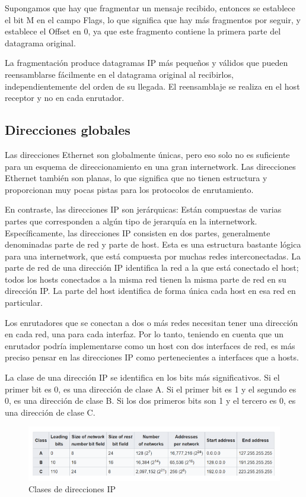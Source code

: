 Supongamos que hay que fragmentar un mensaje recibido, entonces se establece el bit M en el campo Flags, lo que significa que hay más fragmentos por seguir, y establece el Offset en 0, ya que este fragmento contiene la primera parte del datagrama original.

La fragmentación produce datagramas IP más pequeños y válidos que pueden reensamblarse fácilmente en el datagrama original al recibirlos, independientemente del orden de su llegada. El reensamblaje se realiza en el host receptor y no en cada enrutador.

\subsection{Direcciones globales}
Las direcciones Ethernet son globalmente únicas, pero eso solo no es suficiente para un esquema de direccionamiento en una gran internetwork. Las direcciones Ethernet también son planas, lo que significa que no tienen estructura y proporcionan muy pocas pistas para los protocolos de enrutamiento.

En contraste, las direcciones IP son jerárquicas: Están compuestas de varias partes que corresponden a algún tipo de jerarquía en la internetwork. Específicamente, las direcciones IP consisten en dos partes, generalmente denominadas parte de red y parte de host. Esta es una estructura bastante lógica para una internetwork, que está compuesta por muchas redes interconectadas. La parte de red de una dirección IP identifica la red a la que está conectado el host; todos los hosts conectados a la misma red tienen la misma parte de red en su dirección IP. La parte del host identifica de forma única cada host en esa red en particular.

Los enrutadores que se conectan a dos o más redes necesitan tener una dirección en cada red, una para cada interfaz. Por lo tanto, teniendo en cuenta que un enrutador podría implementarse como un host con dos interfaces de red, es más preciso pensar en las direcciones IP como pertenecientes a interfaces que a hosts.

La clase de una dirección IP se identifica en los bits más significativos. Si el primer bit es 0, es una dirección de clase A. Si el primer bit es 1 y el segundo es 0, es una dirección de clase B. Si los dos primeros bits son 1 y el tercero es 0, es una dirección de clase C. 

\begin{figure}[H]
	\centering
	\includegraphics[width=\textwidth
]{images/ip-address-classes.png}
	\caption[Clases de direcciones IP]{Clases de direcciones IP}
	\label{fig:ip-address-classes}
\end{figure}

